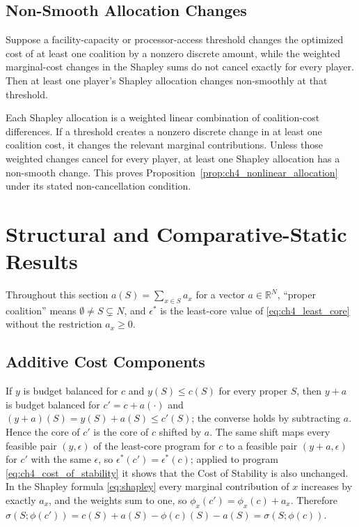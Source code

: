 \subsection{Non-Smooth Allocation Changes}

\begin{proposition}
\label{prop:ch4_nonlinear_allocation}
Suppose a facility-capacity or processor-access threshold changes the optimized
cost of at least one coalition by a nonzero discrete amount, while the weighted
marginal-cost changes in the Shapley sums do not cancel exactly for every
player. Then at least one player's Shapley allocation changes non-smoothly at
that threshold.
\end{proposition}

Each Shapley allocation is a weighted linear combination of coalition-cost
differences. If a threshold creates a nonzero discrete change in at least one
coalition cost, it changes the relevant marginal contributions. Unless those
weighted changes cancel for every player, at least one Shapley allocation has a
non-smooth change. This proves Proposition~\ref{prop:ch4_nonlinear_allocation}
under its stated non-cancellation condition.

\section{Structural and Comparative-Static Results}
\label{app:ch4_structural}

Throughout this section $a(S)=\sum_{x\in S}a_x$ for a vector $a\in\mathbb{R}^N$,
``proper coalition'' means $\emptyset\neq S\subsetneq N$, and $\epsilon^*$ is
the least-core value of \eqref{eq:ch4_least_core} without the restriction
$a_x\geq0$.

\subsection{Additive Cost Components}

If $y$ is budget balanced for $c$ and $y(S)\leq c(S)$ for every proper $S$,
then $y+a$ is budget balanced for $c'=c+a(\cdot)$ and
$(y+a)(S)=y(S)+a(S)\leq c'(S)$; the converse holds by subtracting $a$. Hence
the core of $c'$ is the core of $c$ shifted by $a$. The same shift maps every
feasible pair $(y,\epsilon)$ of the least-core program for $c$ to a feasible
pair $(y+a,\epsilon)$ for $c'$ with the same $\epsilon$, so
$\epsilon^*(c')=\epsilon^*(c)$; applied to program
\eqref{eq:ch4_cost_of_stability} it shows that the Cost of Stability is also
unchanged. In the Shapley formula \eqref{eq:shapley} every marginal
contribution of $x$ increases by exactly $a_x$, and the weights sum to one, so
$\phi_x(c')=\phi_x(c)+a_x$. Therefore
$\sigma(S;\phi(c'))=c(S)+a(S)-\phi(c)(S)-a(S)=\sigma(S;\phi(c))$.

